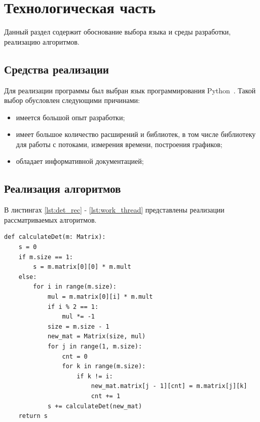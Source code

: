 \documentclass[a4paper,oneside,14pt]{extreport}
\begin{document}
\chapter{Технологическая часть}
Данный раздел содержит обоснование выбора языка и среды разработки, реализацию алгоритмов.

\section{Средства реализации}
Для реализации программы был выбран язык программирования Python~\cite{python}. Такой выбор обусловлен следующими причинами:
\begin{itemize}
	\item имеется большой опыт разработки;
	\item имеет большое количество расширений и библиотек, в том числе библиотеку для работы с потоками, измерения времени, построения графиков;
	\item обладает информативной документацией;
\end{itemize}

\section{Реализация алгоритмов}
В листингах \ref{lst:det_rec} - \ref{lst:work_thread} представлены реализации рассматриваемых алгоритмов.
\captionsetup{singlelinecheck=false, justification=raggedright}
\begin{lstlisting}[caption=Рекурсивный алгоритм вычисления определителя матрицы, label={lst:det_rec}]
def calculateDet(m: Matrix):
	s = 0                                                   
	if m.size == 1:                                         
		s = m.matrix[0][0] * m.mult                         
	else:                                                   
		for i in range(m.size):                             
			mul = m.matrix[0][i] * m.mult
			if i % 2 == 1:               
				mul *= -1                    
			size = m.size - 1            
			new_mat = Matrix(size, mul)  
			for j in range(1, m.size):   
				cnt = 0                      
				for k in range(m.size):      
					if k != i:                   
						new_mat.matrix[j - 1][cnt] = m.matrix[j][k] 
						cnt += 1                                    
			s += calculateDet(new_mat)                  
	return s      
\end{lstlisting}
\end{document}
